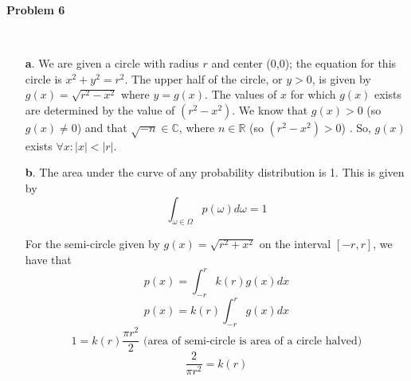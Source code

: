 \textbf{Problem 6}



\begin{solution}\ 
\begin{itemize}
 \item[\textbf{a}.] We are given a circle with radius $r$ and center (0,0); the equation for this circle is $x^2 + y^2 = r^2$. The upper half of the circle, or $y > 0$, is given by $g(x) = \sqrt{r^2 - x^2}$ where $y = g(x)$. The values of $x$ for which $g(x)$ exists are determined by the value of $(r^2 - x^2)$. We know that $g(x) > 0$ (so $g(x) \neq 0$) and that $\sqrt{-n} \in \mathbb{C}$, where $n \in \mathbb{R}$ (so $(r^2 - x^2) > 0$) . So, $g(x)$ exists $\forall x : |x| < |r|$.
 \item[\textbf{b}.] The area under the curve of any probability distribution is 1. This is given by
 \[\int_{\omega \in \Omega} p(\omega)d\omega =1 \]
 
 For the semi-circle given by $g(x) = \sqrt{r^2 + x^2}$ on the interval $[-r, r]$, we have that 
 $$p(x) = \int_{-r}^r k(r)g(x)dx $$
 $$p(x) = k(r) \int_{-r}^r g(x)dx $$
  $$1 = k(r) \frac{\pi r^2}{2} \text{ (area of semi-circle is area of a circle halved)}$$ 
  $$\frac{2}{\pi r^2} = k(r)$$
\end{itemize}
\end{solution}